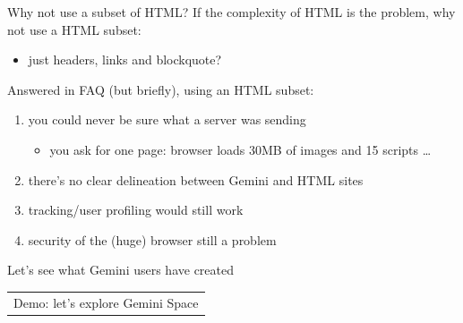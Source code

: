 \documentclass[presentation, 11pt,  aspectratio=169]{beamer}
\begin{document}
\begin{frame}[label={sec:org68bf616}]{Why not use a subset of HTML?}
If the complexity of HTML is the problem, why not use a HTML subset:\\
\begin{itemize}
\item just headers, links and blockquote?\\
\end{itemize}

\pause
\begin{block}{Answered in FAQ (but briefly), using an HTML subset:}
\begin{enumerate}
\item you could never be sure what a server was sending\\
\begin{itemize}
\item you ask for one page: browser loads 30MB of images and 15 scripts \ldots{}\\
\end{itemize}
\item there's no clear delineation between Gemini and HTML sites\\
\item tracking/user profiling would still work\\
\item security of the (huge) browser still a problem\\
\end{enumerate}
\end{block}
\end{frame}

\begin{frame}[label={sec:orgbf04a71}]{Let's see what Gemini users have created}
\begin{center}
\begin{tabular}{c}
Demo: let's explore Gemini Space\\
\end{tabular}
\end{center}
\end{frame}
\end{document}
